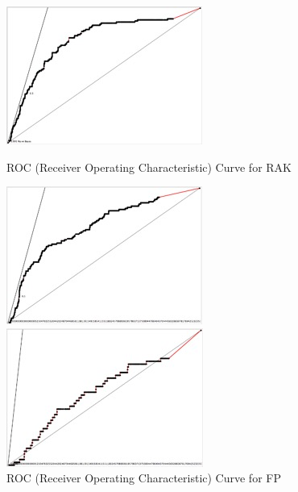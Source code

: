 \begin{figure}[!p] \label{fig:Fig4} 
	\begin{minipage}[b]{0.5\linewidth}
		\centering
		\includegraphics[width=.9\linewidth]{figures/thoeming_Fig4} 
		\caption{ROC (Receiver Operating Characteristic) Curve for RAK} 
	\end{minipage} 
	\begin{minipage}[b]{0.5\linewidth}
		\centering
		\includegraphics[width=.9\linewidth]{figures/thoeming_Fig5} 
		\caption{ROC (Receiver Operating Characteristic) Curve for FP} 
	\end{minipage} 
	\begin{minipage}[b]{0.5\linewidth}
		\centering
		\includegraphics[width=.9\linewidth]{figures/thoeming_Fig6} 

\end{minipage}
\end{figure}
